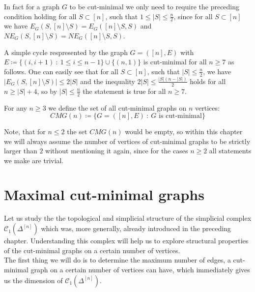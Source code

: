 \begin{rem}\label{remark1}
In fact for a graph \(G\) to be cut-minimal we only need to require the preceding condition holding for all \(S\subset [n]\), such that \(1\leq|S|\leq\frac{n}{2}\), since for all \(S\subset [n]\) we have \(E_G(S,[n]\setminus S)=E_G([n]\setminus S,S)\) and \(NE_G(S,[n]\setminus S)=NE_G([n]\setminus S,S)\).
\end{rem}

\begin{expl}
A simple cycle respresented by the graph \(G=([n],E)\) with\\
\(E\coloneqq \{(i,i+1)\: :\: 1\leq i\leq n-1\}\cup\{(n,1)\}\) is cut-minimal for all \(n\geq 7\) as follows. One can easily see that for all \(S\subset [n]\), such that \(|S|\leq\frac{n}{2}\), we have \(|E_G(S,[n]\setminus S)|\leq 2|S|\) and the inequality \(2|S|\leq\frac{|S|(n-|S|)}{2}\) holds for all \(n\geq |S|+4\), so by \(|S|\leq\frac{n}{2}\) the statement is true for all \(n\geq 7\).
\end{expl}

\begin{defi}
For any \(n\geq 3\) we define the set of all cut-minimal graphs on \(n\) vertices:
\[
CMG(n)\coloneqq \{G=([n],E)\: :\: G\text{ is cut-minimal}\}
\]
\end{defi}

Note, that for \(n\leq 2\) the set \(CMG(n)\) would be empty, so within this chapter we will always assume the number of vertices of cut-minimal graphs to be strictly larger than \(2\) without mentioning it again, since for the cases \(n\geq 2\) all statements we make are trivial.

\section{Maximal cut-minimal graphs}

Let us study the the topological and simplicial structure of the simplicial complex \(\mathcal{C}_1(\Delta^{[n]})\) which was, more generally, already introduced in the preceding chapter. Understanding this complex will help us to explore structural properties of the cut-minimal graphs on a certain number of vertices.\\
The first thing we will do is to determine the maximum number of edges, a cut-minimal graph on a certain number of vertices can have, which immediately gives us the dimension of \(\mathcal{C}_1(\Delta^{[n]})\).

